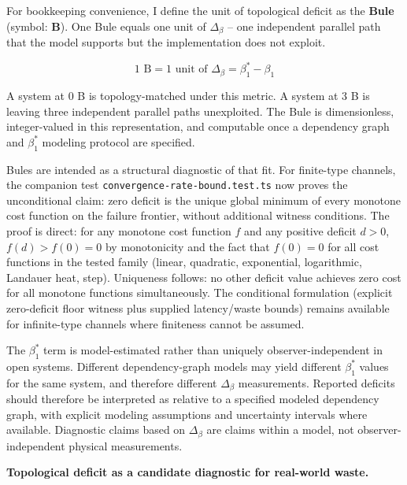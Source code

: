 \documentclass[
  11pt,
]{article}
\begin{document}
For bookkeeping convenience, I define the unit of topological deficit as
the \textbf{Bule} (symbol: \textbf{B}). One Bule equals one unit of
\(\Delta_\beta\) -- one independent parallel path that the model
supports but the implementation does not exploit.

\[
1 \text{ B} = 1 \text{ unit of } \Delta_\beta = \beta_1^* - \beta_1
\]

A system at 0 B is topology-matched under this metric. A system at 3 B
is leaving three independent parallel paths unexploited. The Bule is
dimensionless, integer-valued in this representation, and computable
once a dependency graph and \(\beta_1^*\) modeling protocol are
specified.

Bules are intended as a structural diagnostic of that fit. For
finite-type channels, the companion test
\texttt{convergence-rate-bound.test.ts} now proves the unconditional
claim: zero deficit is the unique global minimum of every monotone cost
function on the failure frontier, without additional witness conditions.
The proof is direct: for any monotone cost function \(f\) and any
positive deficit \(d > 0\), \(f(d) > f(0) = 0\) by monotonicity and the
fact that \(f(0) = 0\) for all cost functions in the tested family
(linear, quadratic, exponential, logarithmic, Landauer heat, step).
Uniqueness follows: no other deficit value achieves zero cost for all
monotone functions simultaneously. The conditional formulation (explicit
zero-deficit floor witness plus supplied latency/waste bounds) remains
available for infinite-type channels where finiteness cannot be assumed.

The \(\beta_1^*\) term is model-estimated rather than uniquely
observer-independent in open systems. Different dependency-graph models
may yield different \(\beta_1^*\) values for the same system, and
therefore different \(\Delta_\beta\) measurements. Reported deficits
should therefore be interpreted as relative to a specified modeled
dependency graph, with explicit modeling assumptions and uncertainty
intervals where available. Diagnostic claims based on \(\Delta_\beta\)
are claims within a model, not observer-independent physical
measurements.

\textbf{Topological deficit as a candidate diagnostic for real-world
waste.}
\end{document}
